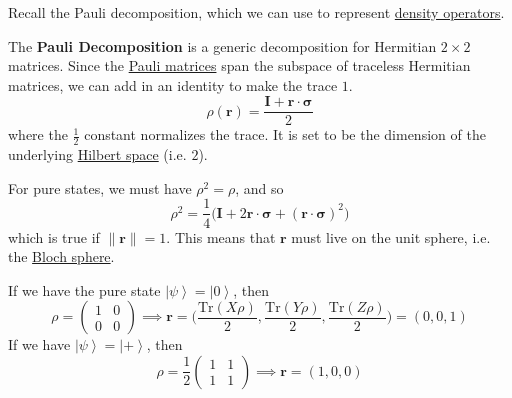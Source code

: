 \documentclass{article}
\newcommand{\ket}[1]{\ensuremath{\left|#1\right\rangle}}
\newcounter{definition}[section]
\newcounter{example}[section]
\begin{document}
      Recall the Pauli decomposition, which we can use to represent \hyperref[def:density-operator]{density operators}. 

      \begin{definition}
        \label{def:pauli-decomposition}
        The \textbf{Pauli Decomposition} is a generic decomposition for Hermitian $2 \times 2$ matrices. Since the \hyperref[dg-def:pauli-matrices]{Pauli matrices} span the subspace of traceless Hermitian matrices, we can add in an identity to make the trace $1$. 
        \begin{equation}
          \rho(\mathbf{r}) = \frac{\mathbf{I} + \mathbf{r} \cdot \boldsymbol{\sigma}}{2}
        \end{equation}
        where the $\frac{1}{2}$ constant normalizes the trace. It is set to be the dimension of the underlying \hyperref[fa-def:hilbert-space]{Hilbert space} (i.e. $2$). 
      \end{definition}

      For pure states, we must have $\rho^2 = \rho$, and so 
      \begin{equation}
        \rho^2 = \frac{1}{4} \big( \mathbf{I} + 2 \mathbf{r} \cdot \boldsymbol{\sigma} + (\mathbf{r} \cdot \boldsymbol{\sigma})^2 \big)
      \end{equation}
      which is true if $\|\mathbf{r}\| = 1$. This means that $\mathbf{r}$ must live on the unit sphere, i.e. the \hyperref[def:bloch-sphere]{Bloch sphere}. 

      \begin{example}[Pauli Decomposition of $\ket{0}$]
        \label{ex:pauli-decomposition-of-ket0}
        If we have the pure state $\ket{\psi} = \ket{0}$, then 
        \begin{equation}
          \rho = \begin{pmatrix} 1 & 0 \\ 0 & 0 \end{pmatrix} \implies \mathbf{r} = \bigg( \frac{\mathrm{Tr}(X \rho)}{2}, \frac{\mathrm{Tr}(Y \rho)}{2}, \frac{\mathrm{Tr}(Z \rho)}{2} \bigg) = (0, 0, 1)
        \end{equation}
        If we have $\ket{\psi} = \ket{+}$, then 
        \begin{equation}
        \rho = \frac{1}{2} \begin{pmatrix} 1 & 1 \\ 1 & 1 \end{pmatrix} \implies \mathbf{r} = (1, 0, 0)
        \end{equation}
      \end{example}
\end{document}

